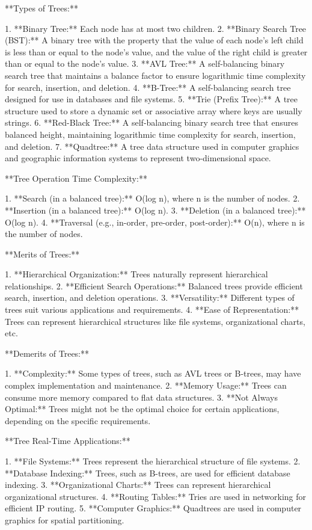 **Types of Trees:**

1. **Binary Tree:** Each node has at most two children.
2. **Binary Search Tree (BST):** A binary tree with the property that the value of each node's left child is less than or equal to the node's value, and the value of the right child is greater than or equal to the node's value.
3. **AVL Tree:** A self-balancing binary search tree that maintains a balance factor to ensure logarithmic time complexity for search, insertion, and deletion.
4. **B-Tree:** A self-balancing search tree designed for use in databases and file systems.
5. **Trie (Prefix Tree):** A tree structure used to store a dynamic set or associative array where keys are usually strings.
6. **Red-Black Tree:** A self-balancing binary search tree that ensures balanced height, maintaining logarithmic time complexity for search, insertion, and deletion.
7. **Quadtree:** A tree data structure used in computer graphics and geographic information systems to represent two-dimensional space.

**Tree Operation Time Complexity:**

1. **Search (in a balanced tree):** O(log n), where n is the number of nodes.
2. **Insertion (in a balanced tree):** O(log n).
3. **Deletion (in a balanced tree):** O(log n).
4. **Traversal (e.g., in-order, pre-order, post-order):** O(n), where n is the number of nodes.

**Merits of Trees:**

1. **Hierarchical Organization:** Trees naturally represent hierarchical relationships.
2. **Efficient Search Operations:** Balanced trees provide efficient search, insertion, and deletion operations.
3. **Versatility:** Different types of trees suit various applications and requirements.
4. **Ease of Representation:** Trees can represent hierarchical structures like file systems, organizational charts, etc.

**Demerits of Trees:**

1. **Complexity:** Some types of trees, such as AVL trees or B-trees, may have complex implementation and maintenance.
2. **Memory Usage:** Trees can consume more memory compared to flat data structures.
3. **Not Always Optimal:** Trees might not be the optimal choice for certain applications, depending on the specific requirements.

**Tree Real-Time Applications:**

1. **File Systems:** Trees represent the hierarchical structure of file systems.
2. **Database Indexing:** Trees, such as B-trees, are used for efficient database indexing.
3. **Organizational Charts:** Trees can represent hierarchical organizational structures.
4. **Routing Tables:** Tries are used in networking for efficient IP routing.
5. **Computer Graphics:** Quadtrees are used in computer graphics for spatial partitioning.

